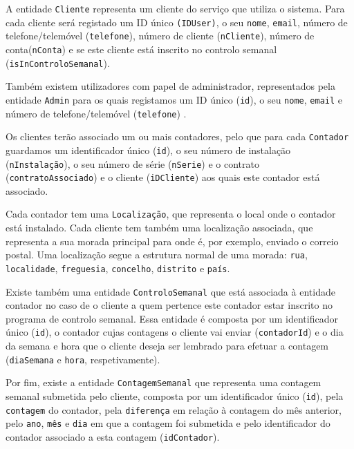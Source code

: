 A entidade \texttt{Cliente} representa um cliente do serviço que utiliza o sistema. Para cada cliente será registado um ID único \texttt{(IDUser)}, o seu \texttt{nome}, \texttt{email}, número de telefone/telemóvel (\texttt{telefone}), número de cliente (\texttt{nCliente}), número de conta(\texttt{nConta}) e se este cliente está inscrito no controlo semanal (\texttt{isInControloSemanal}).\par
Também existem utilizadores com papel de administrador, representados pela entidade \texttt{Admin} para os quais registamos um ID único (\texttt{id}), o seu \texttt{nome}, \texttt{email} e número de telefone/telemóvel (\texttt{telefone}) .\par
Os clientes terão associado um ou mais contadores, pelo que para cada \texttt{Contador} guardamos um identificador único (\texttt{id}), o seu número de instalação (\texttt{nInstalação}), o seu número de série (\texttt{nSerie}) e o contrato (\texttt{contratoAssociado}) e o cliente (\texttt{iDCliente}) aos quais este contador está associado.\par
Cada contador tem uma \texttt{Localização}, que representa o local onde o contador está instalado. Cada cliente tem também uma localização associada, que representa a sua morada principal para onde é, por exemplo, enviado o correio postal. Uma localização segue a estrutura normal de uma morada: \texttt{rua}, \texttt{localidade}, \texttt{freguesia}, \texttt{concelho}, \texttt{distrito} e \texttt{país}.\par
Existe também uma entidade \texttt{ControloSemanal} que está associada à entidade contador no caso de o cliente a quem pertence este contador estar inscrito no programa de controlo semanal. Essa entidade é composta por um identificador único (\texttt{id}), o contador cujas contagens o cliente vai enviar (\texttt{contadorId}) e o dia da semana e hora que o cliente deseja ser lembrado para efetuar a contagem (\texttt{diaSemana} e \texttt{hora}, respetivamente). \par
Por fim, existe a entidade \texttt{ContagemSemanal} que representa uma contagem semanal submetida pelo cliente, composta por um identificador único (\texttt{id}), pela \texttt{contagem} do contador, pela \texttt{diferença} em relação à contagem do mês anterior, pelo \texttt{ano}, \texttt{mês} e \texttt{dia} em que a contagem foi submetida e pelo identificador do contador associado a esta contagem (\texttt{idContador}).


